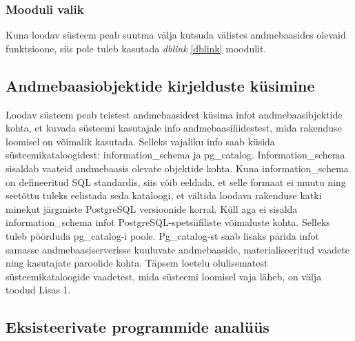 \documentclass[a4paper,12pt]{article} %
\begin{document}
\subsubsection{Mooduli valik}
Kuna loodav süsteem peab suutma välja kutsuda välistes andmebaasides olevaid funktsioone, siis pole tuleb kasutada \textit{dblink} \ref{dblink} moodulit.

\subsection{Andmebaasiobjektide kirjelduste küsimine}
\label{andmebaasi_objektide_kirjelduste_küsimine}
Loodav süsteem peab teistest andmebaasidest küsima infot andmebaasibjektide kohta, et kuvada süsteemi kasutajale info andmebaasiliidestest, mida rakenduse loomisel on võimalik kasutada. Selleks vajaliku info saab küsida süsteemikataloogidest: information\_schema ja pg\_catalog.
Information\_schema sisaldab vaateid andmebaasis olevate objektide kohta. Kuna information\_schema on defineeritud SQL standardis, siis võib eeldada, et selle formaat ei muutu ning seetõttu tuleks eelistada seda kataloogi, et vältida loodava rakenduse katki minekut  järgmiste PostgreSQL versioonide korral. \cite{PostgreSQLInformationSchema} Küll aga ei sisalda information\_schema infot PostgreSQL-spetsiifiliste võimaluste kohta. Selleks tuleb pöörduda pg\_catalog-i poole. Pg\_catalog-st saab lisaks pärida infot samasse andmebaasiserverisse kuuluvate andmebaaside, materialiseeritud vaadete ning kasutajate paroolide kohta. \cite{PostgreSQLSystemCatalogs} Täpsem loetelu olulisematest süsteemikataloogide vaadetest, mida süsteemi loomisel vaja läheb, on välja toodud Lisas 1.

\subsection{Eksisteerivate programmide analüüs}
\end{document}
